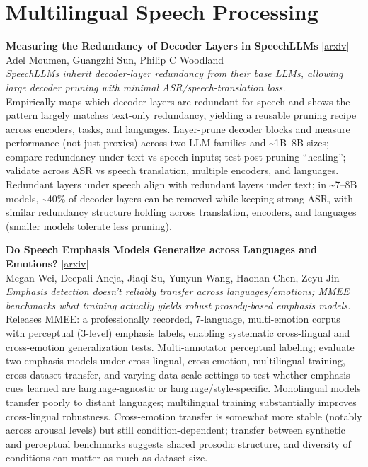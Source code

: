 \documentclass[12pt,letterpaper]{article}
\begin{document}
\medskip


\section*{Multilingual Speech Processing}

{\small\textbf{Measuring the Redundancy of Decoder Layers in SpeechLLMs}} {\scriptsize[\href{https://arxiv.org/abs/2603.05121}{arxiv}]}\\
{\scriptsize Adel Moumen, Guangzhi Sun, Philip C Woodland}\\

{\small\textit{SpeechLLMs inherit decoder-layer redundancy from their base LLMs, allowing large decoder pruning with minimal ASR/speech-translation loss.}}\\[1pt]
{\footnotesize Empirically maps which decoder layers are redundant for speech and shows the pattern largely matches text-only redundancy, yielding a reusable pruning recipe across encoders, tasks, and languages. Layer-prune decoder blocks and measure performance (not just proxies) across two LLM families and \textasciitilde{}1B--8B sizes; compare redundancy under text vs speech inputs; test post-pruning ``healing''; validate across ASR vs speech translation, multiple encoders, and languages. Redundant layers under speech align with redundant layers under text; in \textasciitilde{}7--8B models, \textasciitilde{}40\% of decoder layers can be removed while keeping strong ASR, with similar redundancy structure holding across translation, encoders, and languages (smaller models tolerate less pruning).}

\medskip

{\small\textbf{Do Speech Emphasis Models Generalize across Languages and Emotions?}} {\scriptsize[\href{https://arxiv.org/abs/2606.27717}{arxiv}]}\\
{\scriptsize Megan Wei, Deepali Aneja, Jiaqi Su, Yunyun Wang, Haonan Chen, Zeyu Jin}\\

{\small\textit{Emphasis detection doesn't reliably transfer across languages/emotions; MMEE benchmarks what training actually yields robust prosody-based emphasis models.}}\\[1pt]
{\footnotesize Releases MMEE: a professionally recorded, 7-language, multi-emotion corpus with perceptual (3-level) emphasis labels, enabling systematic cross-lingual and cross-emotion generalization tests. Multi-annotator perceptual labeling; evaluate two emphasis models under cross-lingual, cross-emotion, multilingual-training, cross-dataset transfer, and varying data-scale settings to test whether emphasis cues learned are language-agnostic or language/style-specific. Monolingual models transfer poorly to distant languages; multilingual training substantially improves cross-lingual robustness. Cross-emotion transfer is somewhat more stable (notably across arousal levels) but still condition-dependent; transfer between synthetic and perceptual benchmarks suggests shared prosodic structure, and diversity of conditions can matter as much as dataset size.}
\end{document}
